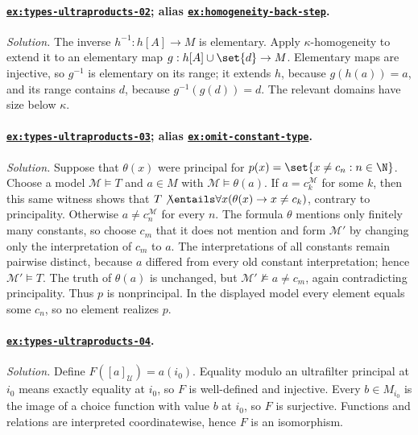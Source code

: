 \paragraph{\hyperref[ex:types-ultraproducts-02]{\texttt{ex:types-ultraproducts-02}};
alias \hyperref[ex:homogeneity-back-step]{\texttt{ex:homogeneity-back-step}}.}
\textit{Solution.}  The inverse \(h^{-1}:h[A]\to M\) is elementary.  Apply
\(\kappa\)-homogeneity to extend it to an elementary map
\(g:h[A]\cup\set{d}\to M\).  Elementary maps are injective, so
\(g^{-1}\) is elementary on its range; it extends \(h\), because
\(g(h(a))=a\), and its range contains \(d\), because
\(g^{-1}(g(d))=d\).  The relevant domains have size below \(\kappa\).

\paragraph{\hyperref[ex:types-ultraproducts-03]{\texttt{ex:types-ultraproducts-03}};
alias \hyperref[ex:omit-constant-type]{\texttt{ex:omit-constant-type}}.}
\textit{Solution.}  Suppose that \(\theta(x)\) were principal for
\(p(x)=\set{x\ne c_n:n\in\N}\).  Choose a model \(\mathcal M\models T\) and
\(a\in M\) with \(\mathcal M\models\theta(a)\).  If
\(a=c_k^{\mathcal M}\) for some \(k\), then this same witness shows that
\(T\not\entails\forall x(\theta(x)\to x\ne c_k)\), contrary to principality.
Otherwise \(a\ne c_n^{\mathcal M}\) for every \(n\).  The formula
\(\theta\) mentions only finitely many constants, so choose \(c_m\) that it
does not mention and form \(\mathcal M'\) by changing only the interpretation
of \(c_m\) to \(a\).  The interpretations of all constants remain pairwise
distinct, because \(a\) differed from every old constant interpretation;
hence \(\mathcal M'\models T\).  The truth of \(\theta(a)\) is unchanged,
but \(\mathcal M'\not\models a\ne c_m\), again contradicting principality.
Thus \(p\) is nonprincipal.  In the displayed model every element equals some
\(c_n\), so no element realizes \(p\).

\paragraph{\hyperref[ex:types-ultraproducts-04]{\texttt{ex:types-ultraproducts-04}}.}
\textit{Solution.}  Define
\(F([a]_{\mathcal U})=a(i_0)\).  Equality modulo an ultrafilter principal at
\(i_0\) means exactly equality at \(i_0\), so \(F\) is well-defined and
injective.  Every \(b\in M_{i_0}\) is the image of a choice function with
value \(b\) at \(i_0\), so \(F\) is surjective.  Functions and relations are
interpreted coordinatewise, hence \(F\) is an isomorphism.


